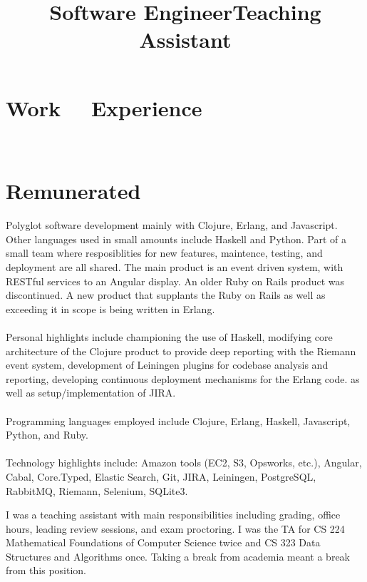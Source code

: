 \documentclass[margintitle,line]{res}
\renewcommand{\subsection}[1]{\section{\normalfont #1}}
\begin{document}
\begin{resume}
\section{Work \ \ Experience}
\ \\
\subsection{Remunerated}

\title{Software Engineer}
\begin{position}
  Polyglot software development mainly with Clojure, Erlang, and Javascript.
  Other languages used in small amounts include Haskell and Python.
  Part of a small team where resposiblities for new
  features, maintence, testing, and deployment are all shared. The
  main product is an event driven system, with RESTful services to
  an Angular display. An older Ruby on Rails product was discontinued.
  A new product that supplants the Ruby on Rails as well as exceeding it in scope
  is being written in Erlang. \\ \ \\
  Personal highlights include championing the use of Haskell, modifying core
  architecture of the Clojure product to provide deep reporting with the Riemann
  event system, development of Leiningen plugins for codebase analysis and reporting,
  developing continuous deployment mechanisms for the Erlang code.
  as well as setup/implementation of JIRA.\\ \ \\
 Programming languages employed include Clojure, Erlang, Haskell, Javascript,
 Python, and Ruby. \\ \ \\
 Technology highlights include: Amazon tools (EC2, S3, Opsworks, etc.),
 Angular, Cabal, Core.Typed, Elastic Search, Git, JIRA, Leiningen,
 PostgreSQL, RabbitMQ, Riemann, Selenium, SQLite3.
\end{position}

\title{Teaching Assistant}
\begin{position}
 I was a teaching assistant with main responsibilities including
 grading, office hours, leading review sessions, and exam
 proctoring. I was the TA for CS 224 Mathematical Foundations of
 Computer Science twice and CS 323 Data Structures and Algorithms
 once. Taking a break from academia meant a break from this position.
\end{position}


\end{resume}
\end{document}
